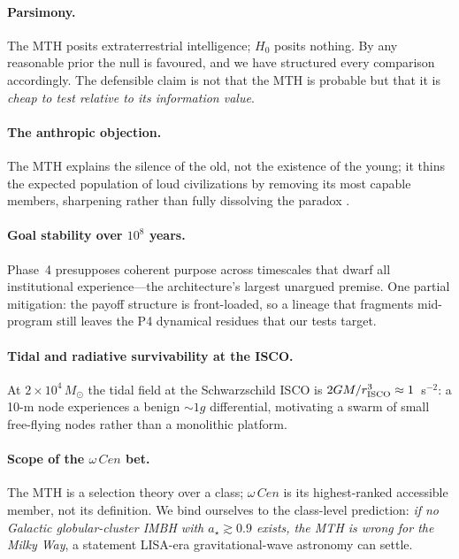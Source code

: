 \documentclass[11pt]{article}
\newcommand{\msun}{M_\odot}
\newcommand{\acen}{\ensuremath{\omega}\,Cen}
\newcommand{\astar}{a_\star}
\begin{document}
\paragraph{Parsimony.} The MTH posits extraterrestrial intelligence; $H_0$ posits nothing. By any reasonable prior the null is favoured, and we have structured every comparison accordingly. The defensible claim is not that the MTH is probable but that it is \emph{cheap to test relative to its information value}.

\paragraph{The anthropic objection.} The MTH explains the silence of the old, not the existence of the young; it thins the expected population of loud civilizations by removing its most capable members, sharpening rather than fully dissolving the paradox \citep{hanson2021}.

\paragraph{Goal stability over $10^{8}$ years.} Phase~4 presupposes coherent purpose across timescales that dwarf all institutional experience---the architecture's largest unargued premise. One partial mitigation: the payoff structure is front-loaded, so a lineage that fragments mid-program still leaves the P4 dynamical residues that our tests target.

\paragraph{Tidal and radiative survivability at the ISCO.} At $2\times10^{4}\,\msun$ the tidal field at the Schwarzschild ISCO is $2GM/r_{\rm ISCO}^{3} \approx 1$~s$^{-2}$: a 10-m node experiences a benign ${\sim}1g$ differential, motivating a swarm of small free-flying nodes rather than a monolithic platform.

\paragraph{Scope of the $\acen$ bet.} The MTH is a selection theory over a class; $\acen$ is its highest-ranked accessible member, not its definition. We bind ourselves to the class-level prediction: \emph{if no Galactic globular-cluster IMBH with $\astar \gtrsim 0.9$ exists, the MTH is wrong for the Milky Way}, a statement LISA-era gravitational-wave astronomy can settle.
\end{document}
